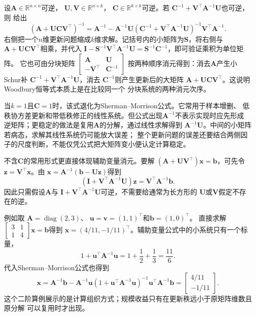 设$\bm{A}\in\mathbb{R}^{n\times n}$可逆，
$\bm{U},\bm{V}\in\mathbb{R}^{n\times k}$，
$\bm{C}\in\mathbb{R}^{k\times k}$可逆。若
$\bm{C}^{-1}+\bm{V}^{\top}\bm{A}^{-1}\bm{U}$也可逆，则
给出
\begin{equation}
  (\bm{A}+\bm{U}\bm{C}\bm{V}^{\top})^{-1}
  =\bm{A}^{-1}-
  \bm{A}^{-1}\bm{U}
  \left(\bm{C}^{-1}+\bm{V}^{\top}\bm{A}^{-1}\bm{U}\right)^{-1}
  \bm{V}^{\top}\bm{A}^{-1}.
  \label{eq:matrix-analysis-woodbury}
\end{equation}
右侧把一个$n$维更新问题缩成$k$维求解。记括号内的小矩阵为$\bm{S}$，将右侧与
$\bm{A}+\bm{U}\bm{C}\bm{V}^{\top}$相乘，并代入
$\bm{I}-\bm{S}^{-1}\bm{V}^{\top}\bm{A}^{-1}\bm{U}
=\bm{S}^{-1}\bm{C}^{-1}$，即可验证乘积为单位矩阵。
它也可由分块矩阵
$\left[\begin{smallmatrix}\bm{A}&\bm{U}\\
-\bm{V}^{\top}&\bm{C}^{-1}\end{smallmatrix}\right]$
按两种顺序消元得到：消去$\bm{A}$产生小Schur补
$\bm{C}^{-1}+\bm{V}^{\top}\bm{A}^{-1}\bm{U}$，消去
$\bm{C}^{-1}$则产生更新后的大矩阵
$\bm{A}+\bm{U}\bm{C}\bm{V}^{\top}$。这说明Woodbury恒等式本质上是在比较同一个
分块系统的两种消元次序。

当$k=1$且$\bm{C}=1$时，该式退化为Sherman--Morrison公式。它常用于样本增删、
低秩协方差更新和带低秩修正的线性系统。但公式出现$\bm{A}^{-1}$不表示实现时应先形成
逆矩阵；更稳定的做法是复用$\bm{A}$的分解，通过线性求解得到
$\bm{A}^{-1}\bm{U}$。中间的小矩阵若病态，求解其线性系统仍可能放大误差；
整个更新问题的误差还要结合两侧因子的尺度判断，不能仅凭公式把大矩阵变小便认定计算稳定。

不含$\bm{C}$的常用形式更直接体现辅助变量消元。要解
$(\bm{A}+\bm{U}\bm{V}^{\top})\bm{x}=\bm{b}$，可先令
$\bm{z}=\bm{V}^{\top}\bm{x}$。由
$\bm{x}=\bm{A}^{-1}(\bm{b}-\bm{U}\bm{z})$得到
\[
  (\bm{I}+\bm{V}^{\top}\bm{A}^{-1}\bm{U})\bm{z}
  =\bm{V}^{\top}\bm{A}^{-1}\bm{b}.
\]
因此只需假设$\bm{A}$与
$\bm{I}+\bm{V}^{\top}\bm{A}^{-1}\bm{U}$可逆，不需要给通常为长方形的
$\bm{U}$或$\bm{V}$假定不存在的逆。

例如取
$\bm{A}=\operatorname{diag}(2,3)$、
$\bm{u}=\bm{v}=(1,1)^{\top}$和$\bm{b}=(1,0)^{\top}$。
直接求解
$\left[\begin{smallmatrix}3&1\\1&4\end{smallmatrix}\right]\bm{x}
=\bm{b}$得到
$\bm{x}=(4/11,-1/11)^{\top}$。辅助变量公式中的小系统只有一个标量，
\[
  1+\bm{u}^{\top}\bm{A}^{-1}\bm{u}
  =1+\frac12+\frac13=\frac{11}{6}.
\]
代入Sherman--Morrison公式也得到
\[
  \bm{x}
  =\bm{A}^{-1}\bm{b}
  -\bm{A}^{-1}\bm{u}
   \left(1+\bm{u}^{\top}\bm{A}^{-1}\bm{u}\right)^{-1}
   \bm{u}^{\top}\bm{A}^{-1}\bm{b}
  =\begin{bmatrix}4/11\\-1/11\end{bmatrix}.
\]
这个二阶算例展示的是计算组织方式；规模收益只有在更新秩远小于原矩阵维数且原分解
可以复用时才出现。

